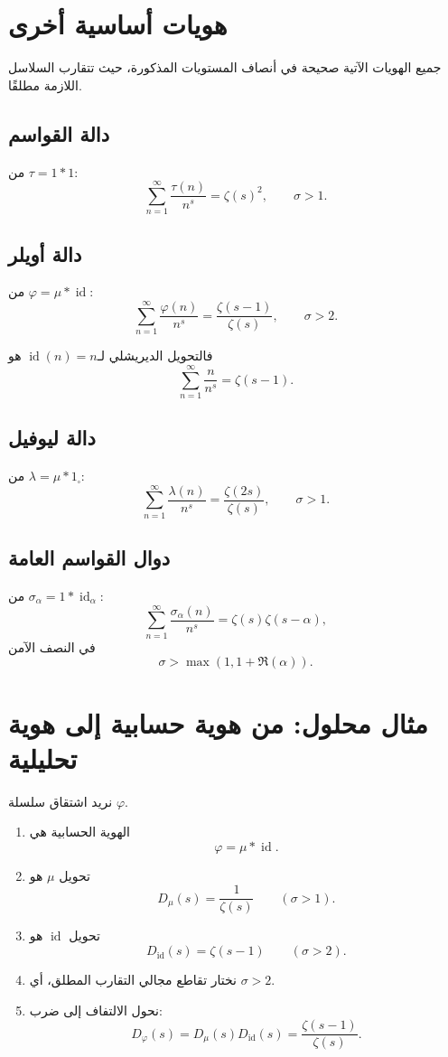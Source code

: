 \section{هويات أساسية أخرى}

جميع الهويات الآتية صحيحة في أنصاف المستويات المذكورة، حيث تتقارب
السلاسل اللازمة مطلقًا.

\subsection{دالة القواسم}

من \(\tau=1*1\):
\[
\sum_{n=1}^{\infty}\frac{\tau(n)}{n^s}
=
\zeta(s)^2,
\qquad \sigma>1.
\]

\subsection{دالة أويلر}

من \(\varphi=\mu*\operatorname{id}\):
\[
\sum_{n=1}^{\infty}\frac{\varphi(n)}{n^s}
=
\frac{\zeta(s-1)}{\zeta(s)},
\qquad \sigma>2.
\]

فالتحويل الديريشلي لـ\(\operatorname{id}(n)=n\) هو
\[
\sum_{n=1}^{\infty}\frac{n}{n^s}=\zeta(s-1).
\]

\subsection{دالة ليوفيل}

من \(\lambda=\mu*1_{\square}\):
\[
\sum_{n=1}^{\infty}\frac{\lambda(n)}{n^s}
=
\frac{\zeta(2s)}{\zeta(s)},
\qquad \sigma>1.
\]

\subsection{دوال القواسم العامة}

من \(\sigma_\alpha=1*\operatorname{id}_\alpha\):
\[
\sum_{n=1}^{\infty}\frac{\sigma_\alpha(n)}{n^s}
=
\zeta(s)\zeta(s-\alpha),
\]
في النصف الآمن
\[
\sigma>\max(1,1+\Re(\alpha)).
\]

\section{مثال محلول: من هوية حسابية إلى هوية تحليلية}

نريد اشتقاق سلسلة \(\varphi\).

\begin{enumerate}
  \item الهوية الحسابية هي
  \[
  \varphi=\mu*\operatorname{id}.
  \]
  \item تحويل \(\mu\) هو
  \[
  D_\mu(s)=\frac1{\zeta(s)}
  \qquad(\sigma>1).
  \]
  \item تحويل \(\operatorname{id}\) هو
  \[
  D_{\operatorname{id}}(s)=\zeta(s-1)
  \qquad(\sigma>2).
  \]
  \item نختار تقاطع مجالي التقارب المطلق، أي \(\sigma>2\).
  \item نحول الالتفاف إلى ضرب:
  \[
  D_\varphi(s)
  =D_\mu(s)D_{\operatorname{id}}(s)
  =\frac{\zeta(s-1)}{\zeta(s)}.
  \]
\end{enumerate}

